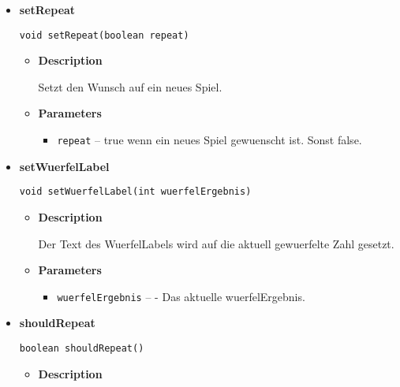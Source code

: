 \documentclass[11pt,a4paper]{report}
\begin{document}
{{{{{{{{{{{{{{{{{\begin{itemize}
{\begin{itemize}
{Der Text des PlayerLabels wird auf den Namen des aktuellen Spieler gesetzt.
}
\item{
{\bf  Parameters}
  \begin{itemize}
   \item{
\texttt{spieler} -- - Der aktuelle Spieler.}
  \end{itemize}
}%
\end{itemize}
}%
\item{ 
{\bf  setRepeat}\\
\begin{lstlisting}[frame=none]
void setRepeat(boolean repeat)\end{lstlisting} %
\begin{itemize}
\item{
{\bf  Description}

Setzt den Wunsch auf ein neues Spiel.
}
\item{
{\bf  Parameters}
  \begin{itemize}
   \item{
\texttt{repeat} -- true wenn ein neues Spiel gewuenscht ist. Sonst false.}
  \end{itemize}
}%
\end{itemize}
}%
\item{ 
{\bf  setWuerfelLabel}\\
\begin{lstlisting}[frame=none]
void setWuerfelLabel(int wuerfelErgebnis)\end{lstlisting} %
\begin{itemize}
\item{
{\bf  Description}

Der Text des WuerfelLabels wird auf die aktuell gewuerfelte Zahl gesetzt.
}
\item{
{\bf  Parameters}
  \begin{itemize}
   \item{
\texttt{wuerfelErgebnis} -- - Das aktuelle wuerfelErgebnis.}
  \end{itemize}
}%
\end{itemize}
}%
\item{ 
{\bf  shouldRepeat}\\
\begin{lstlisting}[frame=none]
boolean shouldRepeat()\end{lstlisting} %
\begin{itemize}
\item{
{\bf  Description}

}
\end{itemize}}
\end{itemize}}}}}}}}}}}}}}}}}}
\end{document}

